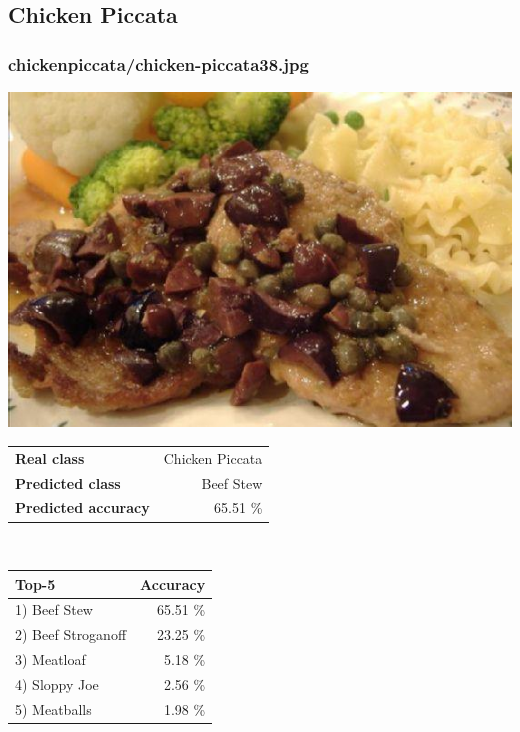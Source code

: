 \subsection{Chicken Piccata}
    
\subsubsection{chicken\textunderscore piccata/chicken-piccata38.jpg}

\begin{minipage}[t]{0.4\textwidth}
	\vspace{0pt}
	\includegraphics[width=\linewidth]{images/evaluation-images/chicken_piccata/chicken-piccata38.jpg}
\end{minipage}
\hfill
\begin{minipage}[t]{0.5\textwidth}
	\vspace{0pt}\raggedright
	\begin{tabularx}{\textwidth}{X r}
		\small \textbf{Real class} & \small Chicken Piccata\\
		\small \textbf{Predicted class} & \small Beef Stew\\
		\small \textbf{Predicted accuracy} & \small 65.51 \%
    \end{tabularx}\\
    
    \vspace{6pt}
	\begin{tabularx}{\textwidth}{X r}
        \small \textbf{Top-5} & \small \textbf{Accuracy} \\
        \hline
		\small 1) Beef Stew & \small 65.51 \%\\\small 2) Beef Stroganoff & \small 23.25 \%\\\small 3) Meatloaf & \small 5.18 \%\\\small 4) Sloppy Joe & \small 2.56 \%\\\small 5) Meatballs & \small 1.98 \%
    \end{tabularx}
\end{minipage}
    
